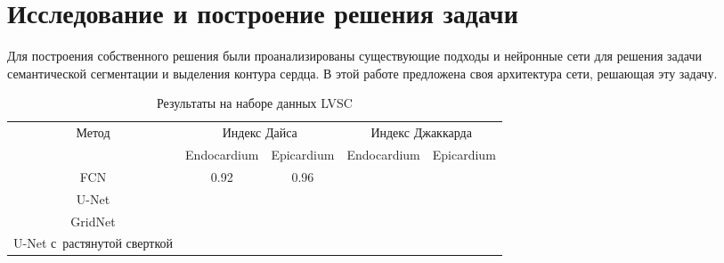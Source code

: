 \section{Исследование и построение решения задачи}

Для построения собственного решения были проанализированы существующие подходы и нейронные сети для решения задачи семантической сегментации и выделения контура сердца. В этой работе предложена своя архитектура сети, решающая эту задачу.

\begin{table}[b]
  \begin{center}
    \caption{Результаты на наборе данных LVSC} \label{tab:lvsc_results}
    \begin{tabular}{ |*{5}{c|} }
      \hline
      \multirow{2}{*}{Метод}      & \multicolumn{2}{c|}{Индекс Дайса} & \multicolumn{2}{c|}{Индекс Джаккарда} \\ \cline{2-5}
                                  & Endocardium & Epicardium          & Endocardium & Epicardium              \\ \hline
      \hline
      FCN                         & 0.92        & 0.96                &             &                         \\ \hline
      U-Net                       &             &                     &             &                         \\ \hline
      GridNet                     &             &                     &             &                         \\ \hline
      U-Net с~растянутой сверткой &             &                     &             &                         \\ 
      \hline
    \end{tabular}
  \end{center}
\end{table}
